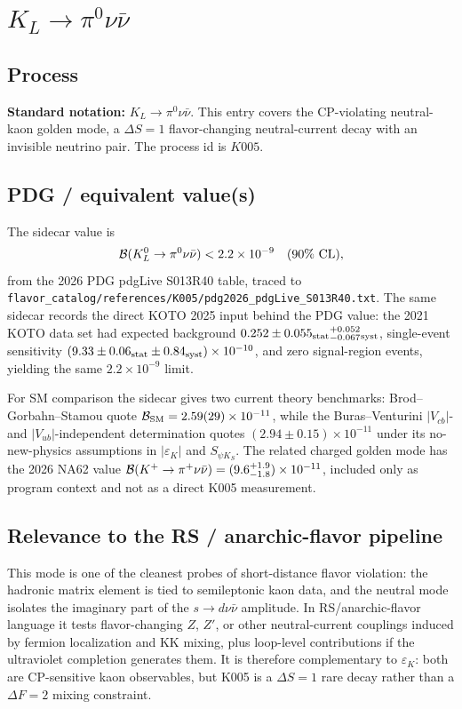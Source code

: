 
\section{\(K_L \to \pi^0\nu\bar\nu\)}

\subsection*{Process}
\textbf{Standard notation:} \(K_L \to \pi^0\nu\bar\nu\).  This entry covers the
CP-violating neutral-kaon golden mode, a \(\Delta S=1\) flavor-changing
neutral-current decay with an invisible neutrino pair.  The process id is
\(K005\).

\subsection*{PDG / equivalent value(s)}
The sidecar value is
\[
  {\cal B}(K_L^0 \to \pi^0\nu\bar\nu) < 2.2\times 10^{-9}
  \quad (90\%~{\rm CL}),
\]
from the 2026 PDG pdgLive S013R40 table, traced to
\texttt{flavor\_catalog/references/K005/pdg2026\_pdgLive\_S013R40.txt}.
The same sidecar records the direct KOTO 2025 input behind the PDG value:
the 2021 KOTO data set had expected background
\(0.252\pm0.055_{\rm stat}{}^{+0.052}_{-0.067}{}_{\rm syst}\), single-event
sensitivity \((9.33\pm0.06_{\rm stat}\pm0.84_{\rm syst})\times10^{-10}\),
and zero signal-region events, yielding the same \(2.2\times10^{-9}\) limit.

For SM comparison the sidecar gives two current theory benchmarks:
Brod--Gorbahn--Stamou quote
\({\cal B}_{\rm SM}=2.59(29)\times10^{-11}\), while the
Buras--Venturini \(|V_{cb}|\)- and \(|V_{ub}|\)-independent determination
quotes \((2.94\pm0.15)\times10^{-11}\) under its no-new-physics assumptions
in \(|\varepsilon_K|\) and \(S_{\psi K_S}\).  The related charged golden mode
has the 2026 NA62 value
\({\cal B}(K^+\to\pi^+\nu\bar\nu)=(9.6^{+1.9}_{-1.8})\times10^{-11}\),
included only as program context and not as a direct K005 measurement.

\subsection*{Relevance to the RS / anarchic-flavor pipeline}
This mode is one of the cleanest probes of short-distance flavor violation:
the hadronic matrix element is tied to semileptonic kaon data, and the neutral
mode isolates the imaginary part of the \(s\to d\nu\bar\nu\) amplitude.  In
RS/anarchic-flavor language it tests flavor-changing \(Z\), \(Z'\), or other
neutral-current couplings induced by fermion localization and KK mixing, plus
loop-level contributions if the ultraviolet completion generates them.  It is
therefore complementary to \(\varepsilon_K\): both are CP-sensitive kaon
observables, but K005 is a \(\Delta S=1\) rare decay rather than a
\(\Delta F=2\) mixing constraint.

